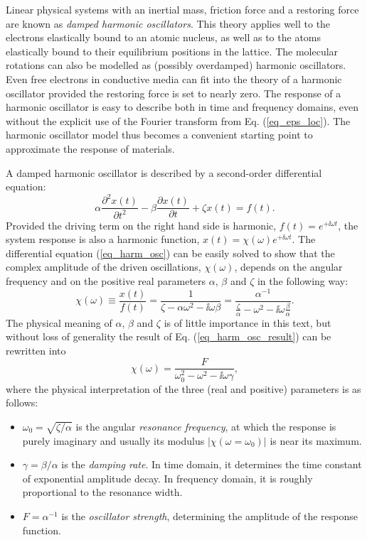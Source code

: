 Linear physical systems with an inertial mass, friction force and a restoring force are known as \textit{damped harmonic oscillators}.  This theory applies well to the electrons elastically bound to an atomic nucleus, as well as to the atoms elastically bound to their equilibrium positions in the lattice. The molecular rotations can also be modelled as (possibly overdamped) harmonic oscillators. Even free electrons in conductive media can fit into the theory of a harmonic oscillator provided the restoring force is set to nearly zero. The response of a harmonic oscillator is easy to describe both in time and frequency domains, even without the explicit use of the Fourier transform from Eq. (\ref{eq_eps_loc}). The harmonic oscillator model thus becomes a convenient starting point to approximate the response of materials.

A damped harmonic oscillator is described by a second-order differential equation:
\begin{equation} \alpha \frac{\partial^{2} x(t)}{\partial t^{2}} - \beta\frac{\partial x(t)}{\partial t} + \zeta x(t) = f(t). \label{eq_harm_osc}\end{equation}
Provided the driving term on the right hand side  is harmonic, $f(t) = e^{+\ii \omega t}$, the system response is also a harmonic function, $x(t) = \chi(\omega) e^{+\ii \omega t}$. The differential equation (\ref{eq_harm_osc}) can be easily solved to show that the complex amplitude of the driven oscillations, $\chi(\omega)$, depends on the angular frequency and on the positive real parameters $\alpha$, $\beta$ and $\zeta$ in the following way:
\begin{equation} \chi(\omega) \equiv \frac{x(t)}{f(t)} = \frac{1}{\zeta-\alpha\omega^{2} - \ii\omega\beta}  = \frac{\alpha^{-1}}{\frac{\zeta}{\alpha}-\omega^{2} - \ii\omega\frac{\beta}{\alpha}}. \label{eq_harm_osc_result}\end{equation}
The physical meaning of $\alpha$, $\beta$ and $\zeta$ is of little importance in this text, but without loss of generality the result of Eq. (\ref{eq_harm_osc_result}) can be rewritten into
\begin{equation} \chi(\omega) = \frac{F}{\omega_0^{2}-\omega^{2} - \ii\omega\gamma}, \label{eq_harm_osc_rewritten}\end{equation}
where the physical interpretation of the three (real and positive) parameters is as follows:
\begin{itemize}
 \item{$\omega_0 = \sqrt{\zeta/\alpha}$ is the angular \textit{resonance frequency}, at which the response is purely imaginary and usually its modulus $|\chi(\omega=\omega_0)|$ is near its maximum.} 
 \item{$\gamma = \beta/\alpha$ is the \textit{damping rate}. In time domain, it determines the time constant of exponential amplitude decay. In frequency domain, it is roughly proportional to the resonance width. } 
 \item{$F = \alpha^{-1}$ is the \textit{oscillator strength}, determining the amplitude of the response function.}
 \end{itemize}


